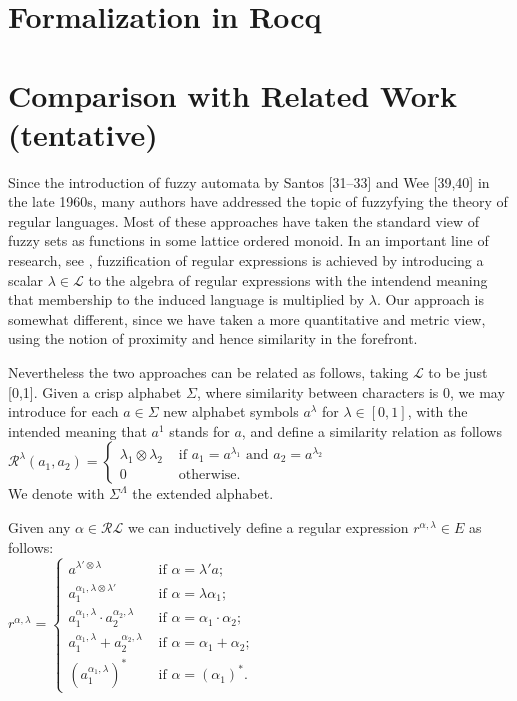 \documentclass{article}
\begin{document}
\section{Formalization in Rocq}
\section{Comparison with Related Work (tentative)}
Since the introduction of fuzzy automata by Santos [31–33] and Wee [39,40] in the late 1960s, many authors have addressed the topic of fuzzyfying the theory of regular languages. Most of these approaches have taken the standard view of fuzzy sets as functions in some lattice ordered monoid. In an important line of research, see \cite{LP06,SC12,GJT17}, fuzzification of regular expressions is achieved by introducing a scalar $\lambda\in \mathcal L$ to the algebra of regular expressions with the intendend meaning that membership to the induced language is multiplied by $\lambda$. Our approach is somewhat different, since we have taken a more quantitative and metric view, using the notion of proximity and hence similarity in the forefront. 

Nevertheless the two approaches can be related as follows, taking  $\mathcal L$ to be just [0,1]. Given a crisp alphabet $\Sigma$, where similarity between characters is 0, we may introduce for each $a\in \Sigma$  new alphabet symbols $a^\lambda$ for $\lambda\in [0,1]$, with the intended meaning that $a^1$ stands for $a$, and define a similarity relation as follows\\
$\mathcal R^\lambda(a_1,a_2)=\begin{cases} \lambda_1 \otimes \lambda_2& \mbox{ if } a_1=a^{\lambda_1} \mbox{ and } a_2=a^{\lambda_2} \\
                                                           0 & \mbox{ otherwise.}
\end{cases}$\\ We denote with $\Sigma^\Lambda$ the extended alphabet.

Given any $\alpha \in \mathcal R \mathcal L$ we can inductively define a regular expression $r^{\alpha,\lambda}\in E$ as follows:\\
$r^{\alpha,\lambda}=\begin{cases} a^{\lambda'\otimes \lambda} & \mbox{ if } \alpha=\lambda' a;\\
 a_1^{\alpha_1,\lambda\otimes \lambda'} & \mbox{ if } \alpha=\lambda \alpha_1;\\
 a_1^{\alpha_1,\lambda}\cdot  a_2^{\alpha_2,\lambda} & \mbox{ if } \alpha=\alpha_1 \cdot \alpha_2;\\
 a_1^{\alpha_1,\lambda}+  a_2^{\alpha_2,\lambda} & \mbox{ if } \alpha=\alpha_1 + \alpha_2;\\
 (a_1^{\alpha_1,\lambda})^\ast & \mbox{ if } \alpha= ( \alpha_1)^\ast.

\end{cases}$\\
\end{document}
